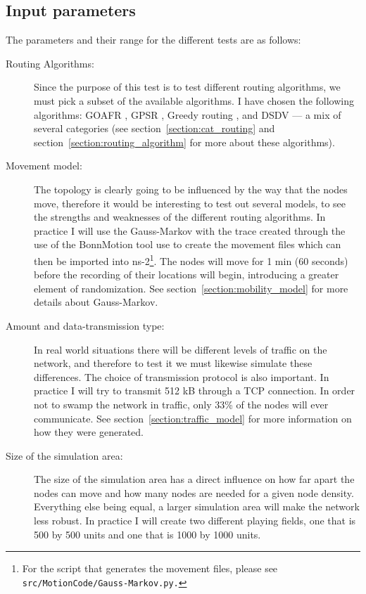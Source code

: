 \subsection{Input parameters}
\label{section:input_parameters}
The parameters and their range for the different tests are as follows:
\begin{description}
\item[Routing Algorithms:] Since the purpose of this test is to test different routing algorithms, we must pick a subset of the available algorithms. I have chosen the following algorithms: GOAFR \cite{gopher}, GPSR \cite{gpsr}, Greedy routing \cite{gopher}, and DSDV \cite{DSDV} --- a mix of several categories (see section~\ref{section:cat_routing} and section~\ref{section:routing_algorithm} for more about these algorithms).

\item[Movement model:] The topology is clearly going to be influenced by the way that the nodes move, therefore it would be interesting to test out several models, to see the strengths and weaknesses of the different routing algorithms. In practice I will use  the Gauss-Markov \cite{MobilityAdHocResearch} with the trace created through the use of the BonnMotion tool \cite{toilers} use to create the movement files which can then be imported into ns-2\footnote{For the script that generates the movement files, please see \texttt{src/MotionCode/Gauss-Markov.py.}}. The nodes will move for 1 min (60 seconds) before the recording of their locations will begin, introducing a greater element of randomization. See section~\ref{section:mobility_model} for more details about Gauss-Markov.

\item[Amount and data-transmission type:] In real world situations there will be different levels of traffic on the network, and therefore to test it we must likewise simulate these differences. The choice of transmission protocol is also important. In practice I will try to transmit 512 kB through a TCP connection. In order not to swamp the network in traffic, only 33\% of the nodes will ever communicate. See section~\ref{section:traffic_model} for more information on how they were generated.

\item[Size of the simulation area:] The size of the simulation area has a direct influence on how far apart the nodes can move and how many nodes are needed for a given node density. Everything else being equal, a larger simulation area will make the network less robust. In practice I will create two different playing fields, one that is 500 by 500 units and one that is 1000 by 1000 units.


\end{description}

